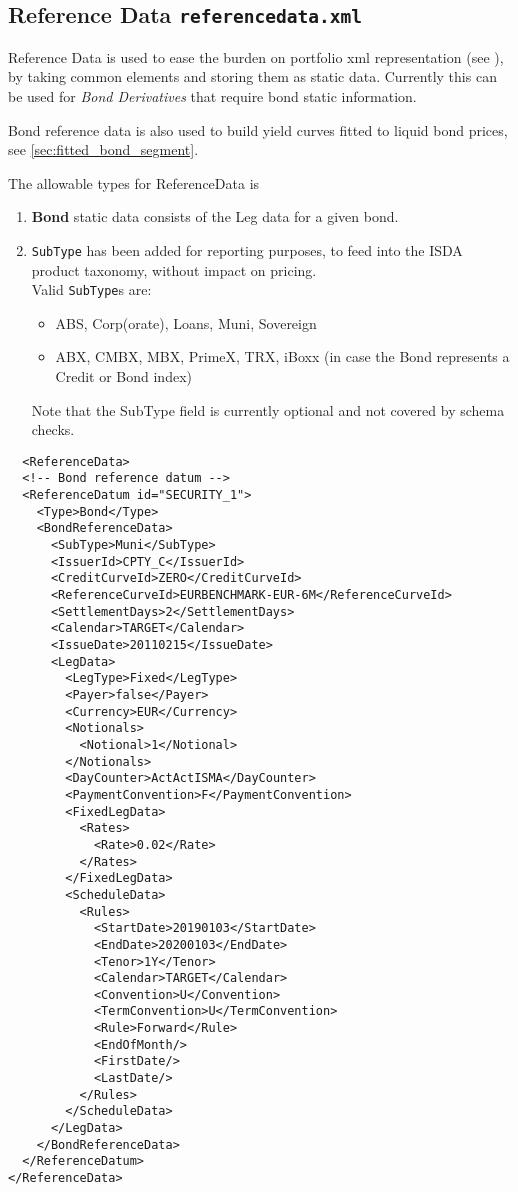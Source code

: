 \subsection{Reference Data {\tt referencedata.xml}}
\label{sec:referencedata}

Reference Data is used to ease the burden on portfolio xml representation (see \cite{products}), by taking common elements and storing them as
static data. Currently this can be used for \textit{Bond Derivatives} that require bond static information.

Bond reference data is also used to build yield curves fitted to liquid bond prices, see \ref{sec:fitted_bond_segment}.

The allowable types for ReferenceData is
\begin{enumerate}
\item \textbf{Bond} static data consists of the Leg data for a given bond.
\item \texttt{SubType} has been added for reporting purposes, to feed into the ISDA product taxonomy, without impact on pricing. \\
  Valid \texttt{SubType}s are: \\
  \begin{itemize}
    \item ABS, Corp(orate), Loans, Muni, Sovereign 
    \item ABX, CMBX, MBX, PrimeX, TRX, iBoxx (in case the Bond represents a Credit or Bond index)
  \end{itemize}
  Note that the SubType field is currently optional and not covered by schema checks.
\end{enumerate}

\begin{verbatim}
  <ReferenceData>
  <!-- Bond reference datum -->
  <ReferenceDatum id="SECURITY_1">
    <Type>Bond</Type>
    <BondReferenceData>
      <SubType>Muni</SubType>
      <IssuerId>CPTY_C</IssuerId>
      <CreditCurveId>ZERO</CreditCurveId>
      <ReferenceCurveId>EURBENCHMARK-EUR-6M</ReferenceCurveId>
      <SettlementDays>2</SettlementDays>
      <Calendar>TARGET</Calendar>
      <IssueDate>20110215</IssueDate>
      <LegData>
        <LegType>Fixed</LegType>
        <Payer>false</Payer>
        <Currency>EUR</Currency>
        <Notionals>
          <Notional>1</Notional>
        </Notionals>
        <DayCounter>ActActISMA</DayCounter>
        <PaymentConvention>F</PaymentConvention>
        <FixedLegData>
          <Rates>
            <Rate>0.02</Rate>
          </Rates>
        </FixedLegData>
        <ScheduleData>
          <Rules>
            <StartDate>20190103</StartDate>
            <EndDate>20200103</EndDate>
            <Tenor>1Y</Tenor>
            <Calendar>TARGET</Calendar>
            <Convention>U</Convention>
            <TermConvention>U</TermConvention>
            <Rule>Forward</Rule>
            <EndOfMonth/>
            <FirstDate/>
            <LastDate/>
          </Rules>
        </ScheduleData>
      </LegData>
    </BondReferenceData>
  </ReferenceDatum>
</ReferenceData>
\end{verbatim}

